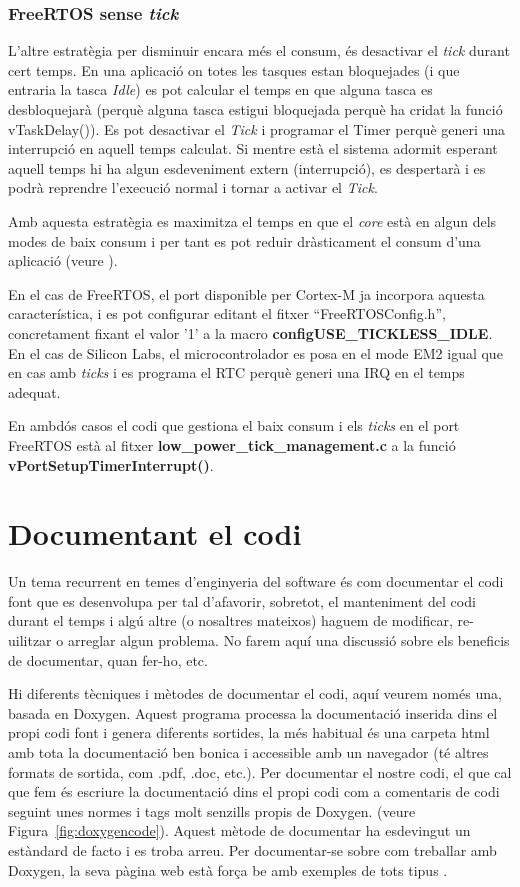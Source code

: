 \subsection{FreeRTOS sense {\em tick}}
\label{sub:tickless}

L'altre estratègia per disminuir encara més el consum, és desactivar el {\em tick} durant cert temps. En una aplicació on totes les tasques estan bloquejades (i que entraria la tasca {\em Idle}) es pot calcular el temps en que alguna tasca es desbloquejarà (perquè alguna tasca estigui bloquejada perquè ha cridat la funció vTaskDelay()). Es pot desactivar el {\em Tick} i programar el Timer perquè generi una interrupció en aquell temps calculat. Si mentre està el sistema adormit esperant aquell temps hi ha algun esdeveniment extern (interrupció), es despertarà i es podrà reprendre l'execució normal i tornar a activar el {\em Tick}.

Amb aquesta estratègia es maximitza el temps en que el {\em core} està en algun dels modes de baix consum i per tant es pot reduir dràsticament el consum d'una aplicació (veure ).

En el cas de FreeRTOS, el port disponible per Cortex-M ja incorpora aquesta característica, i es pot configurar editant el fitxer ``FreeRTOSConfig.h'', concretament fixant el valor '1' a la macro {\bf configUSE\_TICKLESS\_IDLE}. En el cas de Silicon Labs, el microcontrolador es posa en el mode EM2 igual que en cas amb {\em ticks} i es programa el RTC perquè generi una \gls{IRQ} en el temps adequat.

En ambdós casos el codi que gestiona el baix consum i els {\em ticks} en el port FreeRTOS està al fitxer {\bf low\_power\_tick\_management.c} a la funció {\bf vPortSetupTimerInterrupt()}.

\chapter{Documentant el codi}
\label{sec:documentant}
Un tema recurrent en temes d'enginyeria del software és com documentar el codi font que es desenvolupa per tal d'afavorir, sobretot, el manteniment del codi durant el temps i algú altre (o nosaltres mateixos) haguem de modificar, re-uilitzar o arreglar algun problema. No farem aquí una discussió sobre els beneficis de documentar, quan fer-ho, etc.

Hi diferents tècniques i mètodes de documentar el codi, aquí veurem només una, basada en Doxygen. Aquest programa processa la documentació inserida dins el propi codi font i genera diferents sortides, la més habitual és una carpeta html amb tota la documentació ben bonica i accessible amb un navegador (té altres formats de sortida, com .pdf, .doc, etc.). Per documentar el nostre codi, el que cal que fem és escriure la documentació dins el propi codi com a comentaris de codi seguint unes normes i tags molt senzills propis de Doxygen. (veure Figura~\ref{fig:doxygencode}). Aquest mètode de documentar ha esdevingut un estàndard de facto i es troba arreu. Per documentar-se sobre com treballar amb Doxygen, la seva pàgina web està força be amb exemples de tots tipus \cite{Doxygen}.


